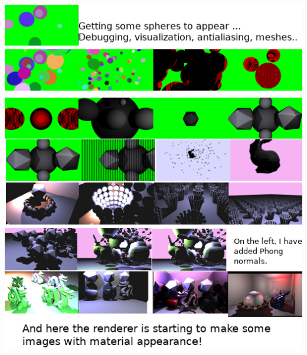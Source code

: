 \documentclass{article}
\begin{document}
\begin{center}\includegraphics[width=\linewidth]{../screenshots/collage.png}\end{center}
\end{document}
